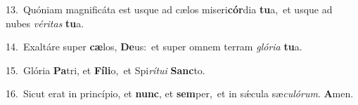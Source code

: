 {\numbfont\textcolor{\numbcolor}{13.}}~Quóniam magnificáta est usque ad cælos miseri\-\textbf{cór}\-dia \textbf{tu}\-a,~\star et usque ad nubes \textit{vé}\-\textit{ri}\textit{tas} \textbf{tu}\-a.\par
{\numbfont\textcolor{\numbcolor}{14.}}~Exaltáre super \textbf{cæ}\-los, \textbf{De}\-us:~\star et super omnem terram \textit{gló}\-\textit{ri}\textit{a} \textbf{tu}\-a.\par
{\numbfont\textcolor{\numbcolor}{15.}}~Glória \textbf{Pa}\-tri, et \textbf{Fí}\-\textbf{li}o,~\star et Spi\-\textit{rí}\-\textit{tu}\textit{i} \textbf{Sanc}\-to.\par
{\numbfont\textcolor{\numbcolor}{16.}}~Sicut erat in princípio, et \textbf{nunc}\-, et \textbf{sem}\-per,~\star et in sǽcula sæ\-\textit{cu}\-\textit{ló}\textit{rum}. \textbf{A}\-men.\par
